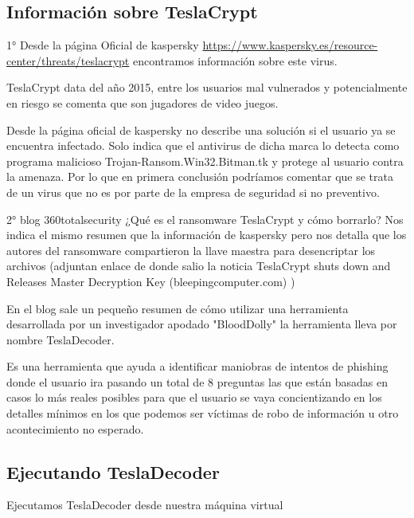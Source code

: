 \documentclass[stu, 11pt, letterpaper, donotrepeattitle, floatsintext, natbib]{apa7}
\begin{document}
\subsection{Información sobre TeslaCrypt} 

1° Desde la página Oficial de kaspersky \citep{teslacrypt} \url{https://www.kaspersky.es/resource-center/threats/teslacrypt} encontramos información sobre este virus.

TeslaCrypt data del año 2015, entre los usuarios mal vulnerados y potencialmente en riesgo se comenta que son jugadores de video juegos.

Desde la página oficial de kaspersky no describe una solución si el usuario ya se encuentra infectado. Solo indica que el antivirus de dicha marca lo detecta como programa malicioso Trojan-Ransom.Win32.Bitman.tk y protege al usuario contra la amenaza. Por lo que en primera conclusión podríamos comentar que se trata de un virus que no es por parte de la empresa de seguridad si no preventivo. 

2° blog 360totalsecurity \citep{blog360} ¿Qué es el ransomware TeslaCrypt y cómo borrarlo?  Nos indica el mismo resumen que la información de kaspersky pero nos detalla que los autores del ransomware compartieron la llave maestra para desencriptar los archivos (adjuntan enlace de donde salio la noticia TeslaCrypt shuts down and Releases Master Decryption Key (bleepingcomputer.com) )

En el blog sale un pequeño resumen de cómo utilizar una herramienta desarrollada por un investigador apodado "BloodDolly" la herramienta lleva por nombre TeslaDecoder.


Es una herramienta que ayuda a identificar maniobras de intentos de phishing donde el usuario ira pasando un total de 8 preguntas las que están basadas en casos lo más reales posibles para que el usuario se vaya concientizando en los detalles mínimos en los que podemos ser víctimas de robo de información u otro acontecimiento no esperado.

\subsection{Ejecutando TeslaDecoder} 

Ejecutamos TeslaDecoder desde nuestra máquina virtual
\end{document}
